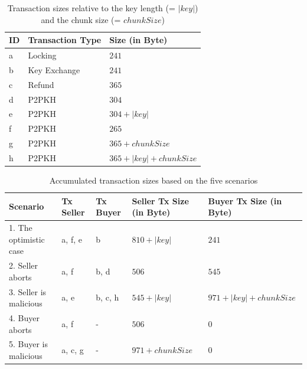 \documentclass{cacthesis}
\begin{document}
	    \begin{table}[]
        \centering
        \begin{tabular}{l|l|l}
        ID & Transaction Type & Size (in Byte)     \\ \hline
        a  & Locking          & $241$                  \\
        b  & Key Exchange     & $241$                  \\
        c  & Refund           & $365$                  \\
        d  & P2PKH            & $304$                  \\
        e  & P2PKH            & $304 + |key|$          \\
        f  & P2PKH            & $265$                  \\
        g  & P2PKH            & $365 + chunkSize$  \\
        h  & P2PKH            & $365 + |key| + chunkSize$
        \end{tabular}
        \caption{Transaction sizes relative to the key length (= $|key|$) and the chunk size (= $chunkSize$)}
        \label{tab:txSizes}
        \end{table}
        
        \begin{table}[]
        \centering
        \begin{tabular}{l|l|l|l|l}
        Scenario               & Tx Seller & Tx Buyer & Seller Tx Size (in Byte) & Buyer Tx Size (in Byte)     \\ \hline
        1. The optimistic case & a, f, e   & b        & $810 + |key|$            & $241$                       \\
        2. Seller aborts       & a, f      & b, d     & $506$                    & $545$                       \\
        3. Seller is malicious & a, e      & b, c, h  & $545 + |key| $           & $971 + |key| + chunkSize$ \\
        4. Buyer aborts        & a, f      & -        & $506$                    & $0$                         \\
        5. Buyer is malicious  & a, c, g   & -        & $971 + chunkSize$      & $0$                        
        \end{tabular}
        \caption{Accumulated transaction sizes based on the five scenarios}
        \label{tab:scenarioSizes}
        \end{table}
\end{document}
